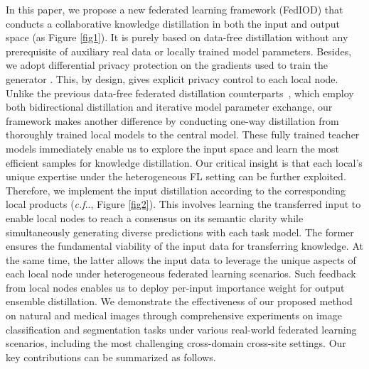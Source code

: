 \documentclass[letterpaper]{article} %
\makeatletter
\DeclareRobustCommand\onedot{\futurelet\@let@token\@onedot}
\def\@onedot{\ifx\@let@token.\else.\null\fi\xspace}
\def\cf{\emph{c.f}\onedot} \def\Cf{\emph{C.f}\onedot}
\makeatother
\begin{document}
In this paper, we propose a new federated learning framework  (FedIOD) that conducts a collaborative knowledge distillation in both the input and output space (as Figure \ref{fig1}).
It is purely based on data-free distillation without any prerequisite of auxiliary real data or locally trained model parameters. Besides, we adopt differential privacy protection on the gradients used to train the generator \cite{torkzadehmahani2019dp, chen2020gs}.
This, by design, gives explicit privacy control to each local node. %
Unlike the previous data-free federated distillation counterparts~\cite{zhu2021data, zhang2022fedzkt, zhang2022fine}, which employ both bidirectional distillation and iterative model parameter exchange, our framework makes another difference by conducting one-way distillation from thoroughly trained local models to the central model. These fully trained teacher models immediately enable us to explore the input space and learn the most efficient samples for knowledge distillation. Our critical insight is that each local's unique expertise under the heterogeneous FL setting can be further exploited. Therefore, we implement the input distillation according to the corresponding local products (\cf, Figure \ref{fig2}). This involves learning the transferred input to enable local nodes to reach a consensus on its semantic clarity while simultaneously generating diverse predictions with each task model. The former ensures the fundamental viability of the input data for transferring knowledge. At the same time, the latter allows the input data to leverage the unique aspects of each local node under heterogeneous federated learning scenarios.
Such feedback from local nodes enables us to deploy per-input importance weight for output ensemble distillation. 
We demonstrate the effectiveness of our proposed method on natural and medical images through comprehensive experiments on image classification and segmentation tasks under various real-world federated learning scenarios, including the most challenging cross-domain cross-site settings. %
Our key contributions can be summarized as follows. 
\end{document}

